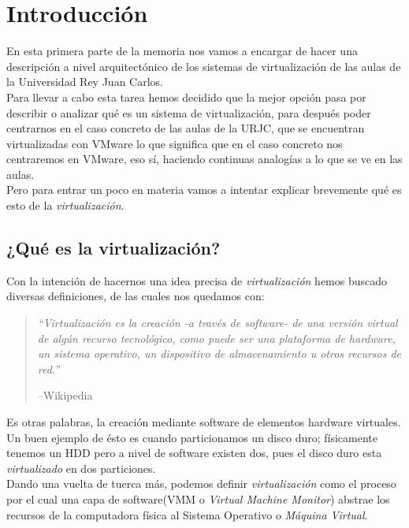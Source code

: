 \chapter{Introducción}
\lettrine[lines=1,slope=4pt,findent=0pt]{E}{}n esta primera parte de la memoria nos vamos a encargar de hacer una descripción a nivel arquitectónico de los sistemas de virtualización de las aulas de la Universidad Rey Juan Carlos.\\

\noindent Para llevar a cabo esta tarea hemos decidido que la mejor opción pasa por describir o analizar qué es un sistema de virtualización, para después poder centrarnos en el caso concreto de las aulas de la URJC, que se encuentran virtualizadas con VMware\cite{vmware} lo que significa que en el caso concreto nos centraremos en VMware, eso sí, haciendo continuas analogías a lo que se ve en las aulas.\\

\noindent Pero para entrar un poco en materia vamos a intentar explicar brevemente qué es esto de la \emph{virtualización}.

\section{¿Qué es la virtualización?}
\noindent Con la intención de hacernos una idea precisa de \emph{virtualización} hemos buscado diversas definiciones, de las cuales nos quedamos con:
\begin{quote}
\emph{\textquotedblleft Virtualización es la creación -a través de software- de una versión virtual de algún recurso tecnológico, como puede ser una plataforma de hardware, un sistema operativo, un dispositivo de almacenamiento u otros recursos de red.\textquotedblright}
\begin{flushright}
--Wikipedia\cite{defvirwiki}
\end{flushright}
\end{quote}

\noindent Es otras palabras, la creación mediante software de elementos hardware virtuales. Un buen ejemplo de ésto es cuando particionamos un disco duro; físicamente tenemos un HDD pero a nivel de software existen dos, pues el disco duro esta \emph{virtualizado} en dos particiones.\\

\noindent Dando una vuelta de tuerca más, podemos definir \emph{virtualización} como el proceso por el cual una capa de software(VMM o \emph{Virtual Machine Monitor}) abstrae los recursos de la computadora física al Sistema Operativo o \emph{Máquina Virtual}.

